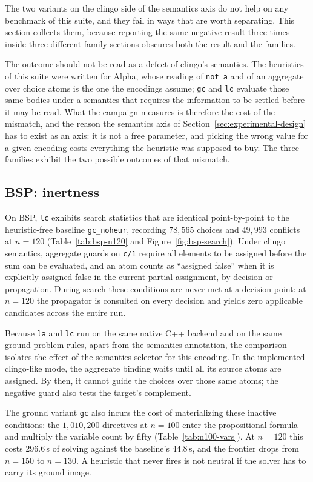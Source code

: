 The two variants on the clingo side of the semantics axis do not help on any benchmark of this suite, and they fail in ways that are worth separating. This section collects them, because reporting the same negative result three times inside three different family sections obscures both the result and the families.

The outcome should not be read as a defect of clingo's semantics. The heuristics of this suite were written for Alpha, whose reading of \texttt{not a} and of an aggregate over choice atoms is the one the encodings assume; \texttt{gc} and \texttt{lc} evaluate those same bodies under a semantics that requires the information to be settled before it may be read. What the campaign measures is therefore the cost of the mismatch, and the reason the semantics axis of Section~\ref{sec:experimental-design} has to exist as an axis: it is not a free parameter, and picking the wrong value for a given encoding costs everything the heuristic was supposed to buy. The three families exhibit the two possible outcomes of that mismatch.

\subsection{BSP: inertness}

On BSP, \texttt{lc} exhibits search statistics that are identical point-by-point to the heuristic-free baseline \texttt{gc\_noheur}, recording $78{,}565$ choices and $49{,}993$ conflicts at $n=120$ (Table~\ref{tab:bsp-n120} and Figure~\ref{fig:bsp-search}). Under clingo semantics, aggregate guards on \texttt{c/1} require all elements to be assigned before the sum can be evaluated, and an atom counts as \enquote{assigned false} when it is explicitly assigned false in the current partial assignment, by decision or propagation. During search these conditions are never met at a decision point: at $n=120$ the propagator is consulted on every decision and yields zero applicable candidates across the entire run.

Because \texttt{la} and \texttt{lc} run on the same native C++ backend and on the same ground problem rules, apart from the semantics annotation, the comparison isolates the effect of the semantics selector for this encoding. In the implemented clingo-like mode, the aggregate binding waits until all its source atoms are assigned. By then, it cannot guide the choices over those same atoms; the negative guard also tests the target's complement.

The ground variant \texttt{gc} also incurs the cost of materializing these inactive conditions: the $1{,}010{,}200$ directives at $n=100$ enter the propositional formula and multiply the variable count by fifty (Table~\ref{tab:n100-vars}). At $n=120$ this costs $296.6$\,s of solving against the baseline's $44.8$\,s, and the frontier drops from $n=150$ to $n=130$. A heuristic that never fires is not neutral if the solver has to carry its ground image.


